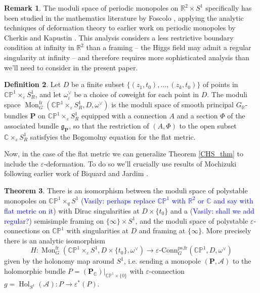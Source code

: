 \documentclass[11pt, oneside, reqno]{amsart}
\theoremstyle{definition} \newtheorem{definition}{Definition}[section]
\newtheorem{theorem}[definition]{Theorem}
\theoremstyle{definition} \newtheorem{remark}[definition]{Remark}
\theoremstyle{definition} \newtheorem{remarks}[definition]{Remarks}
\theoremstyle{definition} \newtheorem{question}[definition]{Question}
\theoremstyle{definition} \newtheorem*{note}{Note}
\theoremstyle{definition} \newtheorem{example}[definition]{Example}
\theoremstyle{definition} \newtheorem{examples}[definition]{Examples}
\renewcommand{\gg}{\mathfrak{g}}
\newcommand{\bb}[1]{\mathbb{#1}}
\newcommand{\mc}[1]{\mathcal{#1}}
\newcommand{\bo}[1]{\boldsymbol{#1}}
\newcommand{\CC}{\mathbb{C}}
\newcommand{\RR}{\mathbb{R}}
\newcommand{\eps}{\varepsilon}
\DeclareMathOperator{\mon}{Mon}
\DeclareMathOperator{\Hol}{Hol}
\newcommand{\epsconn}{\varepsilon\text{-Conn}}
\newcommand{\fr}{\mathrm{fr}}
\newcommand{\vasily}[1]{(\textcolor{blue}{Vasily: #1})}
\begin{document}
\begin{remark}
The moduli space of periodic monopoles on $\RR^2 \times S^1$ specifically has been studied in the mathematics literature by Foscolo \cite{FoscoloDef} , applying the analytic techniques of deformation theory to earlier work on periodic monopoles by Cherkis and Kapustin \cite{CherkisKapustin1, CherkisKapustin2}. This analysis considers a less restrictive boundary condition at infinity in $\RR^2$ than a framing -- the Higgs field may admit a regular singularity at infinity -- and therefore requires more sophisticated analysis than we'll need to consider in the present paper.
\end{remark}

\begin{definition} \label{monopole_moduli_def}
Let $D$ be a finite subset $\{(z_1,t_0), \ldots, (z_k, t_0)\}$ of points in $\bb{CP}^1 \times_\eps S^1_R$, and let $\omega^\vee_{i}$ be a choice of coweight for each point in $D$. The moduli space $\mon^\fr_G(\bb{CP}^1 \times_\eps S^1_R, D, \omega^\vee)$ is the moduli space of smooth principal $G_\RR$-bundles $\bo P$ on $\bb{CP}^1 \times_\eps S^1_R$ equipped with a connection $A$ and a section $\Phi$ of the associated bundle $\gg_{\bo P}$, so that the restriction of $(A,\Phi)$ to the open subset $\CC \times_\eps S^1_R$ satisfyies the Bogomolny equation for the flat metric.
\end{definition}

Now, in the case of the flat metric we can generalize Theorem \ref{CHS_thm} to include the $\eps$-deformation.  To do so we'll crucially use results of Mochizuki \cite{MochizukiKH} following earlier work of Biquard and Jardim \cite{BiquardJardim}.

\begin{theorem} \label{monopole_qconn_comparison_thm}
There is an isomorphism between the moduli space of polystable monopoles on $\bb{CP}^1 \times_q S^1$ \vasily{perhaps replace $\mathbb{CP}^{1}$ with $\mathbb{R}^2$ or $\mathbb{C}$ and say with flat metric on it} with Dirac singularities at $D \times \{t_0\}$ and a \vasily{shall we add regular?} semisimple framing on $\{\infty\} \times S^1$, and the moduli space of polystable $\eps$-connections on $\bb{CP}^1$ with singularities at $D$ and framing at $\{\infty\}$.  More precisely there is an analytic isomorphism
\[H \colon \mon^{\fr}_G(\bb{CP}^1 \times_\eps S^1, D \times \{t_0\}, \omega^\vee) \to \epsconn_G^{\text{ps,fr}}(\bb{CP}^1, D, \omega^\vee)\]
given by the holonomy map around $S^1$, i.e. sending a monopole $(\bo P, \mc A)$ to the holomorphic bundle $P = (\bo P_\CC)|_{\bb{CP}^1 \times \{0\}}$ with $\eps$-connection $g = \Hol_{S^1}(\mc A) \colon P \to \eps^*(P)$.
\end{theorem}
\end{document}
